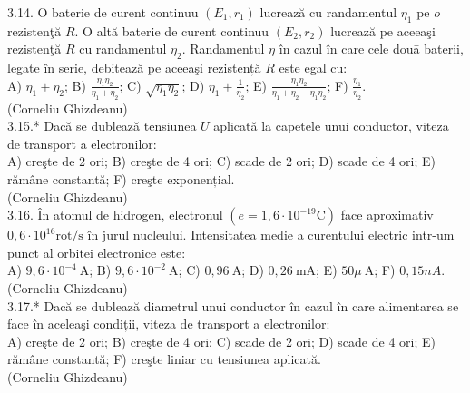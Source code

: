 \documentclass[10pt]{article}
\begin{document}
3.14. O baterie de curent continuu $\left(E_{1}, r_{1}\right)$ lucrează cu randamentul $\eta_{1}$ pe $o$ rezistenţă $R$. O altă baterie de curent continuu $\left(E_{2}, r_{2}\right)$ lucrează pe aceeaşi rezistenţă $R$ cu randamentul $\eta_{2}$. Randamentul $\eta$ în cazul în care cele douā baterii, legate în serie, debitează pe aceeaşi rezistență $R$ este egal cu:\\ A) $\eta_{1}+\eta_{2}$; B) $\frac{\eta_{1} \eta_{2}}{\eta_{1}+\eta_{2}}$; C) $\sqrt{\eta_{1} \eta_{2}}$; D) $\eta_{1}+\frac{1}{\eta_{2}}$; E) $\frac{\eta_{1} \eta_{2}}{\eta_{1}+\eta_{2}-\eta_{1} \eta_{2}}$; F) $\frac{\eta_{1}}{\eta_{2}}$.\\ (Corneliu Ghizdeanu)\\

3.15.* Dacă se dublează tensiunea $U$ aplicată la capetele unui conductor, viteza de transport a electronilor:\\ A) creşte de 2 ori; B) creşte de 4 ori; C) scade de 2 ori; D) scade de 4 ori; E) rămâne constantă; F) creşte exponențial.\\ (Corneliu Ghizdeanu)\\

3.16. În atomul de hidrogen, electronul $\left(e=1,6 \cdot 10^{-19} \mathrm{C}\right)$ face aproximativ $0,6 \cdot 10^{16} \mathrm{rot} / \mathrm{s}$ în jurul nucleului. Intensitatea medie a curentului electric intr-um punct al orbitei electronice este:\\ A) $9,6 \cdot 10^{-4} \mathrm{~A}$; B) $9,6 \cdot 10^{-2} \mathrm{~A}$; C) $0,96 \mathrm{~A}$; D) $0,26 \mathrm{~mA}$; E) $50 \mu \mathrm{~A}$; F) $0,15 n A$.\\ (Corneliu Ghizdeanu)\\

3.17.* Dacă se dublează diametrul unui conductor în cazul în care alimentarea se face în aceleaşi condiții, viteza de transport a electronilor:\\ A) creşte de 2 ori; B) creşte de 4 ori; C) scade de 2 ori; D) scade de 4 ori; E) rămâne constantă; F) creşte liniar cu tensiunea aplicată.\\ (Corneliu Ghizdeanu)\\
\end{document}
